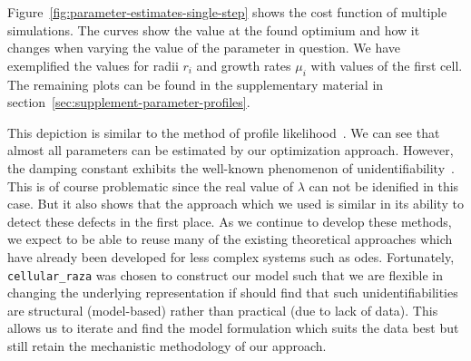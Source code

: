 \documentclass{article}
\begin{document}
Figure~\ref{fig:parameter-estimates-single-step} shows the cost function of multiple simulations.
The curves show the value at the found optimium and how it changes when varying the value of the
parameter in question.
We have exemplified the values for radii $r_i$ and growth rates $\mu_i$ with values of the first
cell.
The remaining plots can be found in the supplementary material in
section~\ref{sec:supplement-parameter-profiles}.

This depiction is similar to the method of profile likelihood~\cite{Raue2009}.
We can see that almost all parameters can be estimated by our optimization approach.
However, the damping constant exhibits the well-known phenomenon of
unidentifiability~\cite{Raue2009}.
This is of course problematic since the real value of $\lambda$ can not be idenified in this case.
But it also shows that the approach which we used is similar in its ability to detect these defects
in the first place.
As we continue to develop these methods, we expect to be able to reuse many of the existing
theoretical approaches which have already been developed for less complex systems such as \acp{ode}.
Fortunately, \texttt{cellular\_raza} was chosen to construct our model such that we are flexible in
changing the underlying representation if should find that such unidentifiabilities are structural
(model-based) rather than practical (due to lack of data).
This allows us to iterate and find the model formulation which suits the data best but still retain
the mechanistic methodology of our approach.
\end{document}
